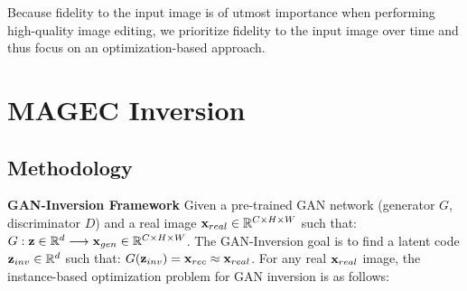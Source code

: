 Because fidelity to the input image is of utmost importance when performing 
high-quality image editing, we prioritize fidelity to the input image over time 
and thus focus on an optimization-based approach.




\section{MAGEC Inversion}
\label{section:magec}



\subsection{Methodology}
 
\noindent \textbf{GAN-Inversion Framework} Given a pre-trained GAN network (generator $G$, 
discriminator $D$) and a real image $\mathbf{x}_{real} \in \mathbb{R}^{C\times H\times W}$ such that: $
    G : \mathbf{z} \in \mathbb{R}^{d} \longrightarrow \mathbf{x}_{gen} \in \mathbb{R}^{C\times H\times W}$.
     The GAN-Inversion goal is to find a latent code $\mathbf{z}_{inv} \in \mathbb{R}^{d}$ such that: 
     $G(\mathbf{z}_{inv}) = \mathbf{x}_{rec} \approx \mathbf{x}_{real}$.
 For any real $\mathbf{x}_{real}$ image, the instance-based optimization problem for GAN inversion is as follows:

